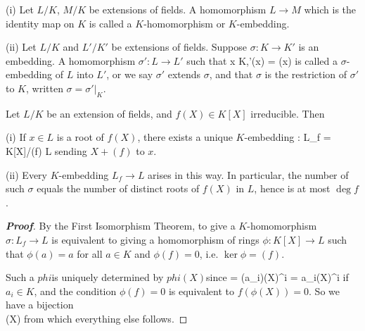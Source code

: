 \begin{definition}
\ben
\item [(i)] Let $L/K$, $M/K$ be extensions of fields. A homomorphism $L \to M$ which is the identity map on $K$ is called a $K$-homomorphism or $K$-embedding.
\item [(ii)] Let $L/K$ and $L'/K'$ be extensions of fields. Suppose $\sigma : K \to K'$ is an embedding. A homomorphism $\sigma' : L \to L'$ such that
\be
\forall x \in K,\quad \sigma'(x) = \sigma(x)
\ee
is called a $\sigma$-embedding of $L$ into $L'$, or we say $\sigma'$ extends $\sigma$, and that $\sigma$ is the restriction of $\sigma'$ to $K$, written $\sigma = \sigma'|_K$.
\een
\end{definition}

\begin{theorem}
Let $L/K$ be an extension of fields, and $f(X) \in K[X]$ irreducible. Then
\ben
\item [(i)] If $x \in L$ is a root of $f(X)$, there exists a unique $K$-embedding
\be
\sigma : L_f = K[X]/(f) \to L
\ee
sending $X + (f)$ to $x$.
\item [(ii)] Every $K$-embedding $L_f \to L$ arises in this way. In particular, the number of such $\sigma$ equals the number of distinct roots of $f(X)$ in $L$, hence is at most $\deg f$.
\een
\end{theorem}

\begin{proof}[\bf Proof]
By the First Isomorphism Theorem, to give a $K$-homomorphism $\sigma : L_f \to L$ is equivalent to giving a homomorphism of rings $\phi: K[X] \to L$ such that $\phi(a) = a$ for all $a \in K$ and $\phi(f) = 0$, i.e. $\ker \phi = (f)$.



Such a $phi$is uniquely determined by $phi(X)$since
\be
\phi{} = \sum \phi(a_i)\phi(X)^i = \sum a_i\phi(X)^i
\ee
if $a_i \in K$, and the condition $\phi(f) = 0$ is equivalent to $f(\phi(X)) = 0$. So we have a bijection 
\be
{}
 \stackrel{\sim}{\longrightarrow}  \qquad\qquad\qquad\qquad\\
\phi \mapsto \phi(X)
\ea
\ee
from which everything else follows.
\end{proof}



